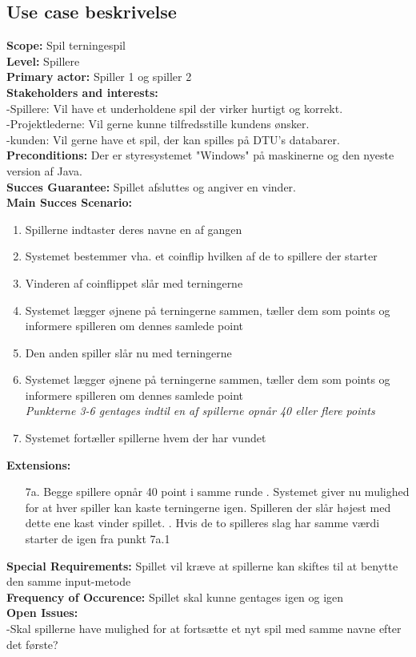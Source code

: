 \documentclass{article}
\begin{document}
\subsection{Use case beskrivelse}
\textbf{Scope:} Spil terningespil\\
\textbf{Level:} Spillere\\
\textbf{Primary actor:} Spiller 1 og spiller 2\\
\textbf{Stakeholders and interests:}\\
-Spillere: Vil have et underholdene spil der virker hurtigt og korrekt.\\
-Projektlederne: Vil gerne kunne tilfredsstille kundens ønsker.\\
-kunden: Vil gerne have et spil, der kan spilles på DTU's databarer.\\
\textbf{Preconditions:} Der er styresystemet "Windows" på maskinerne og den nyeste version af Java.\\
\textbf{Succes Guarantee:} Spillet afsluttes og angiver en vinder.\\
\textbf{Main Succes Scenario:}\\
\begin{enumerate}
\itemsep-0.5em
    \item Spillerne indtaster deres navne en af gangen
    \item Systemet bestemmer vha. et coinflip hvilken af de to spillere der starter
    \item Vinderen af coinflippet slår med terningerne
    \item Systemet lægger øjnene på terningerne sammen, tæller dem som points og informere spilleren om dennes samlede point
    \item Den anden spiller slår nu med terningerne
    \item Systemet lægger øjnene på terningerne sammen, tæller dem som points og informere spilleren om dennes samlede point\\
    \textit{Punkterne 3-6 gentages indtil en af spillerne opnår 40 eller flere points}
    \item Systemet fortæller spillerne hvem der har vundet
\end{enumerate}

\textbf{Extensions:}
\begin{enumerate}
\itemsep-0.5em
    \item [7a.] Begge spillere opnår 40 point i samme runde
    . Systemet giver nu mulighed for at hver spiller kan kaste terningerne igen. Spilleren der slår  højest med dette ene kast vinder spillet.
    . Hvis de to spilleres slag har samme værdi starter de igen fra punkt 7a.1
\end{enumerate}
\textbf{Special Requirements:} Spillet vil kræve at spillerne kan skiftes til at benytte den samme input-metode\\
\textbf{Frequency of Occurence:} Spillet skal kunne gentages igen og igen\\
\textbf{Open Issues:} \\
-Skal spillerne have mulighed for at fortsætte et nyt spil med samme navne efter det første?\\
\end{document}
